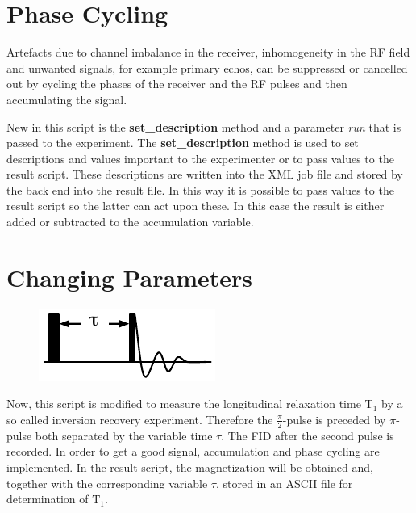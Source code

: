 \documentclass[12pt, a4paper, BCOR10mm, twoside, titlepage, headinclude]{scrbook}
\begin{document}
\section{Phase Cycling}
Artefacts due to channel imbalance in the receiver, inhomogeneity in the RF field and unwanted signals, for example primary echos, can be suppressed or cancelled out by cycling the phases \citep{Berger:2004vn} of the receiver and the RF pulses and then accumulating the signal.

New in this script is the \textbf{set\_description} method and a parameter \emph{run} that is passed to the experiment. The  \textbf{set\_description} method is used to set descriptions and values important to the experimenter or to pass values to the result script. These descriptions are written into the \textsf{XML} job file and stored by the back end into the result file. In this way it is possible to pass values to the result script so the latter can act upon these. In this case the result is either added or subtracted to the accumulation variable.
\section{Changing Parameters}
\begin{figure}
\mbox{\includegraphics[]{inversion_recovery}}
\end{figure}
Now, this script is modified to measure the longitudinal relaxation time $\textrm{T}_{1}$ by a so called inversion recovery experiment. Therefore the $\frac{\pi}{2}$-pulse is preceded by $\pi$-pulse both separated by the variable time $\tau$. The FID after the second pulse is recorded. In order to get a good signal, accumulation and phase cycling are implemented.
In the result script, the magnetization will be obtained and, together with the corresponding variable $\tau$, stored in an \textsf{ASCII} file for determination of $\textrm{T}_{1}$.


\end{document}

